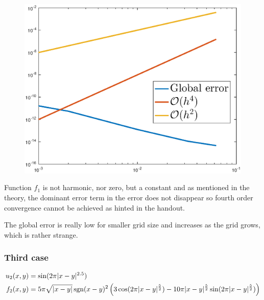 \documentclass[main.tex]{subfiles}
\begin{document}
\begin{figure}[h]
\begin{minipage}{.3\textwidth}
  \includegraphics[width=.9\linewidth]{../Figures/ex2u1err}
  \label{fig:ex2:u1err}
\end{minipage}
\end{figure}

Function $f_1$ is not harmonic, nor zero, but a constant and as mentioned in the theory, the dominant error term in the error does not disappear so fourth order convergence cannot be achieved as hinted in the handout.

The global error is really low for smaller grid size and increases as the grid grows, which is rather strange.

\subsubsection*{Third case}
\begin{align}
    u_{2}(x,y) &= \sin(2 \pi |x-y|^{2.5}) \\
    f_2(x,y) &= 5 \pi \sqrt{|x-y|} \operatorname{sgn}(x-y)^2 \left(3 \cos(2 \pi |x-y|^{\frac{5}{2}}) - 10 \pi |x-y|^{\frac{5}{2}} \sin(2 \pi |x-y|^{\frac{5}{2}}) \right)
\end{align}
\end{document}
